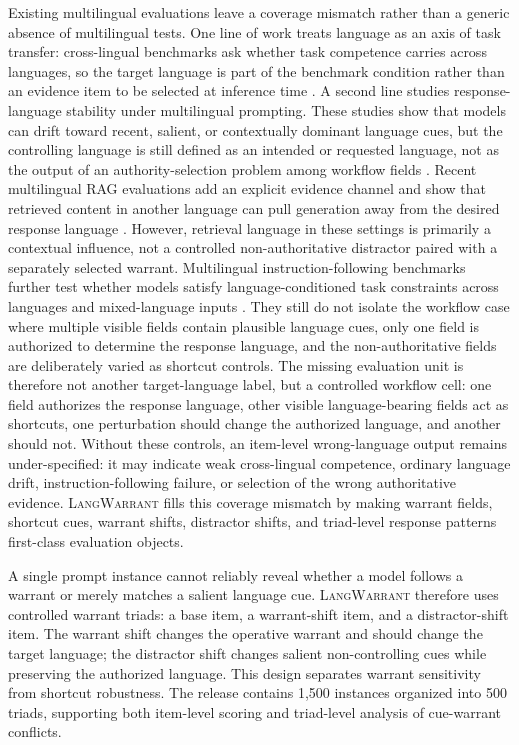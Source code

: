 \documentclass[10pt,conference]{IEEEtran}
\newcommand{\dataset}{\textsc{LangWarrant}}
\begin{document}
Existing multilingual evaluations leave a coverage mismatch rather than a generic absence of multilingual tests. One line of work treats language as an axis of task transfer: cross-lingual benchmarks ask whether task competence carries across languages, so the target language is part of the benchmark condition rather than an evidence item to be selected at inference time \cite{hu2020xtreme}. A second line studies response-language stability under multilingual prompting. These studies show that models can drift toward recent, salient, or contextually dominant language cues, but the controlling language is still defined as an intended or requested language, not as the output of an authority-selection problem among workflow fields \cite{marchisio2024languageconfusion,zhang2024respond}. Recent multilingual RAG evaluations add an explicit evidence channel and show that retrieved content in another language can pull generation away from the desired response language \cite{li2026ragdrift}. However, retrieval language in these settings is primarily a contextual influence, not a controlled non-authoritative distractor paired with a separately selected warrant. Multilingual instruction-following benchmarks further test whether models satisfy language-conditioned task constraints across languages and mixed-language inputs \cite{dussolle2025mifeval}. They still do not isolate the workflow case where multiple visible fields contain plausible language cues, only one field is authorized to determine the response language, and the non-authoritative fields are deliberately varied as shortcut controls. The missing evaluation unit is therefore not another target-language label, but a controlled workflow cell: one field authorizes the response language, other visible language-bearing fields act as shortcuts, one perturbation should change the authorized language, and another should not. Without these controls, an item-level wrong-language output remains under-specified: it may indicate weak cross-lingual competence, ordinary language drift, instruction-following failure, or selection of the wrong authoritative evidence. \dataset{} fills this coverage mismatch by making warrant fields, shortcut cues, warrant shifts, distractor shifts, and triad-level response patterns first-class evaluation objects.

A single prompt instance cannot reliably reveal whether a model follows a warrant or merely matches a salient language cue. \dataset{} therefore uses controlled warrant triads: a base item, a warrant-shift item, and a distractor-shift item. The warrant shift changes the operative warrant and should change the target language; the distractor shift changes salient non-controlling cues while preserving the authorized language. This design separates warrant sensitivity from shortcut robustness. The release contains 1,500 instances organized into 500 triads, supporting both item-level scoring and triad-level analysis of cue-warrant conflicts.
\end{document}
